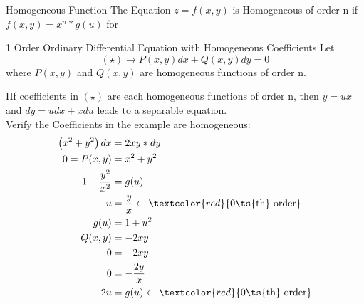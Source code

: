 \begin{imp:defn}{Homogeneous Function}{} The Equation $z=f(x,y)$ is Homogeneous of order n if $f(x,y)=x^n*g(u)$ for %
\end{imp:defn}
\begin{imp:defn}{1 Order Ordinary Differential Equation with Homogeneous Coefficients}{} Let $$(\star ) \rightarrow P(x,y) dx+Q(x,y)dy=0$$ where $P(x,y)$ and $Q(x,y)$ are homogeneous functions of order n.
\end{imp:defn}
\begin{imp:thm}{} IIf coefficients in $(\star )$ are each homogeneous functions of order n, then $y=ux$ and $dy=udx+xdu$ leads to a separable equation.\\
Verify the Coefficients in the example are homogeneous:\\
\begin{align*}
    \left( x^2+y^2\right) dx &= 2xy*dy\\
    0 = P(x,y) &= x^2 + y^2\\
    1+\frac{y^2}{x^2} &= g(u)\\
    u&= \frac{y}{x} \leftarrow \textcolor{red}{\text{0\ts{th} order}}\\
    g(u) &= 1+u^2\\
    Q(x,y) &= -2xy\\
    0 &= -2xy\\
    0 &= -\frac{2y}{x}\\
    -2u &= g(u) \leftarrow \textcolor{red}{\text{0\ts{th} order}}
\end{align*}
\end{imp:thm}